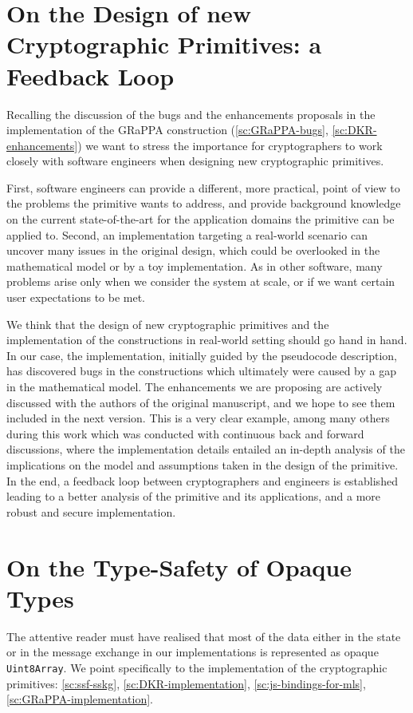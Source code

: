 \section{On the Design of new Cryptographic Primitives: a Feedback Loop}\label{sc:collaboration-crypto-se}

Recalling the discussion of the bugs and the enhancements 
proposals in the implementation of the GRaPPA construction
(\cref{sc:GRaPPA-bugs}, \cref{sc:DKR-enhancements})
we want to stress the importance for
cryptographers to work closely with software engineers
when designing new cryptographic primitives.

First, software engineers can provide a different, more
practical, point of view to the problems the primitive
wants to address, and provide background knowledge
on the current state-of-the-art for the application
domains the primitive can be applied to.
Second, an implementation targeting a real-world scenario
can uncover many issues in the original design, which could be
overlooked in the mathematical model or by a toy implementation.
As in other software, many problems arise only when
we consider the system at scale, or if we want certain
user expectations to be met.

We think that the design of new cryptographic primitives and
the implementation of the constructions in real-world
setting should go hand in hand. 
In our case, the implementation, 
initially guided by the pseudocode 
description, has discovered bugs in the constructions which
ultimately were caused by a gap in the mathematical model.
The enhancements we are proposing are actively discussed
with the authors of the original manuscript, and we hope
to see them included in the next version.
This is a very clear
example, among many others during this work which was conducted 
with continuous back and forward discussions, 
where the implementation details entailed 
an in-depth analysis of the implications on the model and 
assumptions taken in the design of the primitive.
In the end, a feedback loop between cryptographers and engineers 
is established leading to
a better analysis of the primitive and its applications,
and a more robust and secure implementation.


\section{On the Type-Safety of Opaque Types}\label{sc:gap-type-safety-of-opaque-byte-arrays}
The attentive reader must have realised that most of the data either in the state
or in the message exchange in our implementations is represented as opaque \texttt{Uint8Array}.
We point specifically to the implementation of the cryptographic primitives:
\cref{sc:ssf-sskg}, \cref{sc:DKR-implementation}, \cref{sc:js-bindings-for-mls}, \cref{sc:GRaPPA-implementation}.

